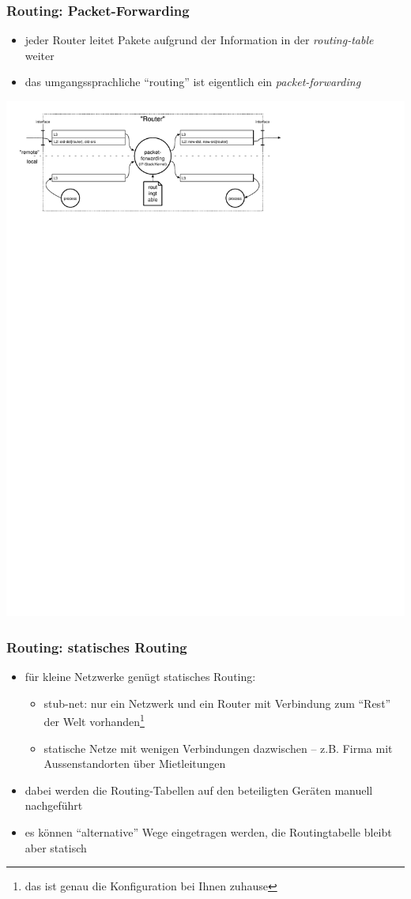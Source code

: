 \documentclass[ignorenonframetext]{beamer}
\begin{document}
\begin{frame}
\frametitle{Routing: Packet-Forwarding}
\begin{itemize}
	\item{jeder Router leitet Pakete aufgrund der Information in der {\em routing-table} weiter}
	\item{das umgangssprachliche ``routing'' ist eigentlich ein {\em packet-forwarding}}
\end{itemize}
\includegraphics[width=16cm]{routing-packetforwarding}
\end{frame}

\begin{frame}
\frametitle{Routing: statisches Routing}
\begin{itemize}
  \item f\"ur kleine Netzwerke gen\"ugt statisches Routing:
    \begin{itemize}
      \item stub-net: nur ein Netzwerk und ein Router mit Verbindung zum ``Rest'' der Welt vorhanden\footnote{das ist genau die Konfiguration bei Ihnen zuhause}
      \item statische Netze mit wenigen Verbindungen dazwischen -- z.B. Firma mit Aussenstandorten \"uber Mietleitungen
    \end{itemize}
  \item dabei werden die Routing-Tabellen auf den beteiligten Ger\"aten manuell nachgef\"uhrt
  \item es k\"onnen ``alternative'' Wege eingetragen werden, die Routingtabelle bleibt aber statisch
\end{itemize}
\end{frame}
\end{document}
